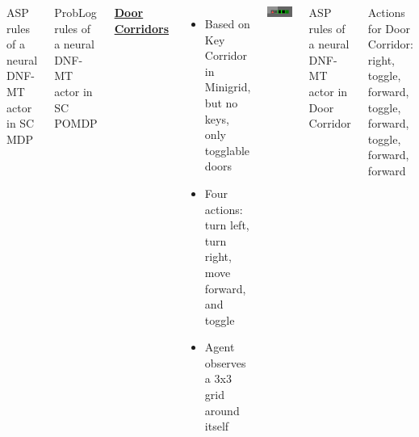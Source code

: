 \documentclass{tikzposter} %
\begin{document}
\begin{columns}
{        \begin{center}
            {\small ASP rules of a neural DNF-MT actor in SC MDP}
            
        \end{center}

        \begin{center}
            {\small ProbLog rules of a neural DNF-MT actor in SC POMDP}
            
        \end{center}

        \vspace{0.5em}

        {\color{ImperialBlue}\underline{\sffamily\textbf{Door Corridors}}}

        \begin{itemize}
            \item Based on Key Corridor in Minigrid, but no keys, only togglable
                  doors

            \item Four actions: turn left, turn right, move forward, and toggle

            \item Agent observes a 3x3 grid around itself
        \end{itemize}

        \begin{center}
            \includegraphics[width=0.8\colwidth]{img/door-corridor}
        \end{center}

        \begin{center}
            {\small ASP rules of a neural DNF-MT actor in Door Corridor}
            
        \end{center}
        Actions for Door Corridor: right, toggle, forward, toggle, forward,
        toggle, forward, forward

        \vspace{1em}

}
\end{columns}
\end{document}
